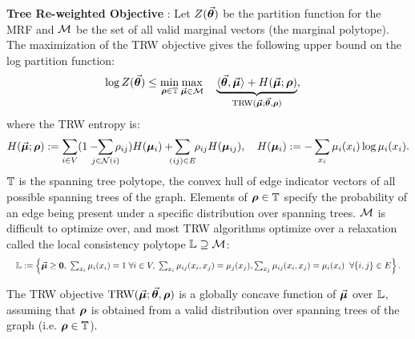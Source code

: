 {\bf Tree Re-weighted Objective} \citep{wainwright2005new}:
%
%
Let $Z(\vec{\bm{\theta}})$ be the partition function for the MRF and $\mathcal{M}$ be the set of all valid marginal vectors (the marginal polytope). The maximization of the TRW objective gives the following
upper bound on the log partition function:
\begingroup 
\vspace{-1mm}
\setlength\belowdisplayskip{-12pt} %
\begin{equation}
\begin{split}
\label{eqn:upperBoundPartition}
\log Z(\vec{\bm{\theta}}) &\leq \min_{\bm{\rho} \in \mathbb{T}} \max_{\vec{\bm{\mu}} \in \mathcal{M}}\quad \underbrace{\langle\vec{\bm{\theta}},\vec{\bm{\mu}}\rangle + H(\vec{\bm{\mu}};\bm{\rho})}_{\text{TRW}(\vec{\bm{\mu}};\vec{\bm{\theta}},\bm{\rho})},
\end{split}
\end{equation}
%
%
%
%
%
%
%
%
%
%
%
%
%
%
%
%
where the TRW entropy is:
\endgroup
\begin{equation}
	\label{eqn:trw_entropy_like_bethe}
	\trwent := \sum_{i\in V}(1-\hspace{-3mm}\sum_{j\in \nbrs{i}}\hspace{-2mm}\rho_{ij})H(\bmu_i) 
	+\hspace{-2mm} \sum_{(ij)\in
          E}\hspace{-1mm}\rho_{ij}H(\bmu_{ij}), \quad H(\bmu_i) :=   -\sum_{x_i} \mu_i(x_i)\log\mu_i(x_i).
\end{equation}
%
$\mathbb{T}$ is the spanning tree polytope, the convex hull
of edge indicator vectors of all possible spanning trees of the graph. 
Elements of $\bm{\rho}\in \mathbb{T}$ specify the probability of an
edge being present under a specific distribution over spanning trees.
$\mathcal{M}$ is difficult to optimize over, and most
TRW algorithms optimize over a relaxation called
the local consistency polytope $\mathbb{L} \supseteq \mathcal{M}$:
\vspace{-1mm}
\begin{equation*}
%
%
\resizebox{\hsize}{!}{$\LOCAL:=\left\{\vmu\geq \bm{0},\;\sum_{x_i} \mu_i(x_i) = 1 \;\forall i\in V,\;\sum_{x_i} \mu_{ij}(x_i,x_j) = \mu_j(x_j), \sum_{x_j} \mu_{ij}(x_i,x_j) = \mu_i(x_i)\;\;\forall \edges \right\}.$}
%
%
%
%
%
%
\end{equation*}
\vspace{-3mm}

%
%
%
%
%
%

%
The TRW objective $\text{TRW}(\vec{\bm{\mu}};\vec{\bm{\theta}},\bm{\rho})$ is a globally concave function of $\vec{\bm{\mu}}$ over $\mathbb{L}$,
assuming that $\bm{\rho}$ is obtained from a valid distribution over spanning
trees of the graph (i.e. $\bm{\rho} \in \mathbb{T}$). 
%

